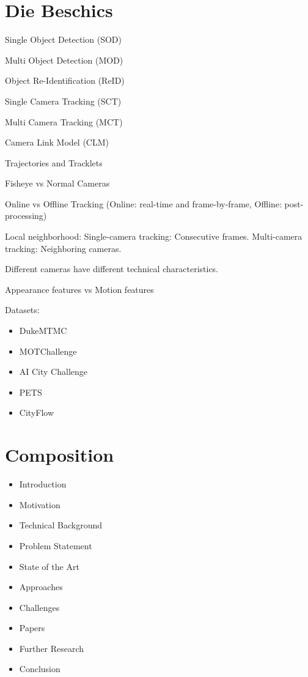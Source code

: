 \section{Die Beschics}

Single Object Detection (SOD)

Multi Object Detection (MOD)

Object Re-Identification (ReID)

Single Camera Tracking (SCT)

Multi Camera Tracking (MCT)

Camera Link Model (CLM)

Trajectories and Tracklets

Fisheye vs Normal Cameras

Online vs Offline Tracking (Online: real-time and frame-by-frame, Offline: post-processing)

Local neighborhood:
Single-camera tracking: Consecutive frames.
Multi-camera tracking: Neighboring cameras.

Different cameras have different technical characteristics.

Appearance features vs Motion features

Datasets:
\begin{itemize}
    \item DukeMTMC
    \item MOTChallenge
    \item AI City Challenge
    \item PETS
    \item CityFlow
\end{itemize}

\section{Composition}

\begin{itemize}
    \item Introduction
    \item Motivation
    \item Technical Background
    \item Problem Statement
    \item State of the Art
    \item Approaches
    \item Challenges
    \item Papers
    \item Further Research
    \item Conclusion
\end{itemize}

